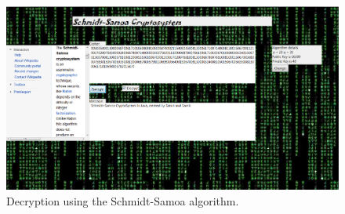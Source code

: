 \documentclass[12pt]{article} %
\begin{document}
\begin{figure}[h!]
  \centering
   \includegraphics[scale=0.50]{decrypt.png}
  \caption{Decryption using the Schmidt-Samoa algorithm.}
\end{figure}
\end{document}
